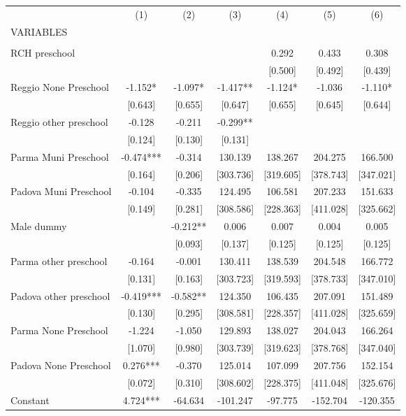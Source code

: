 \begin{tabular}{lcccccc} \hline
 & (1) & (2) & (3) & (4) & (5) & (6) \\
VARIABLES &  &  &  &  &  &  \\ \hline
 &  &  &  &  &  &  \\
RCH preschool &  &  &  & 0.292 & 0.433 & 0.308 \\
 &  &  &  & [0.500] & [0.492] & [0.439] \\
Reggio None Preschool & -1.152* & -1.097* & -1.417** & -1.124* & -1.036 & -1.110* \\
 & [0.643] & [0.655] & [0.647] & [0.655] & [0.645] & [0.644] \\
Reggio other preschool & -0.128 & -0.211 & -0.299** &  &  &  \\
 & [0.124] & [0.130] & [0.131] &  &  &  \\
Parma Muni Preschool & -0.474*** & -0.314 & 130.139 & 138.267 & 204.275 & 166.500 \\
 & [0.164] & [0.206] & [303.736] & [319.605] & [378.743] & [347.021] \\
Padova Muni Preschool & -0.104 & -0.335 & 124.495 & 106.581 & 207.233 & 151.633 \\
 & [0.149] & [0.281] & [308.586] & [228.363] & [411.028] & [325.662] \\
Male dummy &  & -0.212** & 0.006 & 0.007 & 0.004 & 0.005 \\
 &  & [0.093] & [0.137] & [0.125] & [0.125] & [0.125] \\
Parma other preschool & -0.164 & -0.001 & 130.411 & 138.539 & 204.548 & 166.772 \\
 & [0.131] & [0.163] & [303.723] & [319.593] & [378.733] & [347.010] \\
Padova other preschool & -0.419*** & -0.582** & 124.350 & 106.435 & 207.091 & 151.489 \\
 & [0.130] & [0.295] & [308.581] & [228.357] & [411.028] & [325.659] \\
Parma None Preschool & -1.224 & -1.050 & 129.893 & 138.027 & 204.043 & 166.264 \\
 & [1.070] & [0.980] & [303.739] & [319.623] & [378.768] & [347.040] \\
Padova None Preschool & 0.276*** & -0.370 & 125.014 & 107.099 & 207.756 & 152.154 \\
 & [0.072] & [0.310] & [308.602] & [228.375] & [411.048] & [325.676] \\
Constant & 4.724*** & -64.634 & -101.247 & -97.775 & -152.704 & -120.355 \\

\end{tabular}
